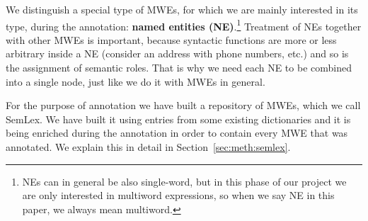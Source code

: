 We distinguish a special type of MWEs, for which we are mainly interested in its type, during the annotation: {\bf named entities (NE)}.\footnote{NEs can in general be also single-word, but in this phase of our project we are only interested in multiword expressions, so when we say NE in this paper, we always mean multiword.} 
%
Treatment of NEs together with other MWEs is important, because syntactic functions
are more or less arbitrary inside a NE (consider an address with phone numbers, etc.) and so is the assignment of semantic roles.
That is why we need each NE to be combined into a single node, just like we do it with MWEs in general. 


For the purpose of annotation we have built a repository of MWEs, which we call SemLex. We have built it using entries from some existing dictionaries and it is being enriched during the annotation in order to contain every MWE that was annotated. We explain this in detail in Section~\ref{sec:meth:semlex}. 


